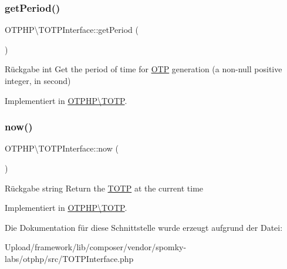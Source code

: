 \subsubsection{\texorpdfstring{get\+Period()}{getPeriod()}}
{\footnotesize\ttfamily O\+T\+P\+H\+P\textbackslash{}\+T\+O\+T\+P\+Interface\+::get\+Period (\begin{DoxyParamCaption}{ }\end{DoxyParamCaption})}

\begin{DoxyReturn}{Rückgabe}
int Get the period of time for \mbox{\hyperlink{class_o_t_p_h_p_1_1_o_t_p}{O\+TP}} generation (a non-\/null positive integer, in second) 
\end{DoxyReturn}


Implementiert in \mbox{\hyperlink{class_o_t_p_h_p_1_1_t_o_t_p_a0c10be1997c54b7ab6fbbd7f72bbeb0b}{O\+T\+P\+H\+P\textbackslash{}\+T\+O\+TP}}.

\mbox{\label{interface_o_t_p_h_p_1_1_t_o_t_p_interface_a0501ec004da411bdc5e2c193dffe8191}} 
\subsubsection{\texorpdfstring{now()}{now()}}
{\footnotesize\ttfamily O\+T\+P\+H\+P\textbackslash{}\+T\+O\+T\+P\+Interface\+::now (\begin{DoxyParamCaption}{ }\end{DoxyParamCaption})}

\begin{DoxyReturn}{Rückgabe}
string Return the \mbox{\hyperlink{class_o_t_p_h_p_1_1_t_o_t_p}{T\+O\+TP}} at the current time 
\end{DoxyReturn}


Implementiert in \mbox{\hyperlink{class_o_t_p_h_p_1_1_t_o_t_p_ab07cbc06fbc17b68852cdf722f40e58e}{O\+T\+P\+H\+P\textbackslash{}\+T\+O\+TP}}.



Die Dokumentation für diese Schnittstelle wurde erzeugt aufgrund der Datei\+:\begin{DoxyCompactItemize}
\item 
Upload/framework/lib/composer/vendor/spomky-\/labs/otphp/src/T\+O\+T\+P\+Interface.\+php\end{DoxyCompactItemize}
